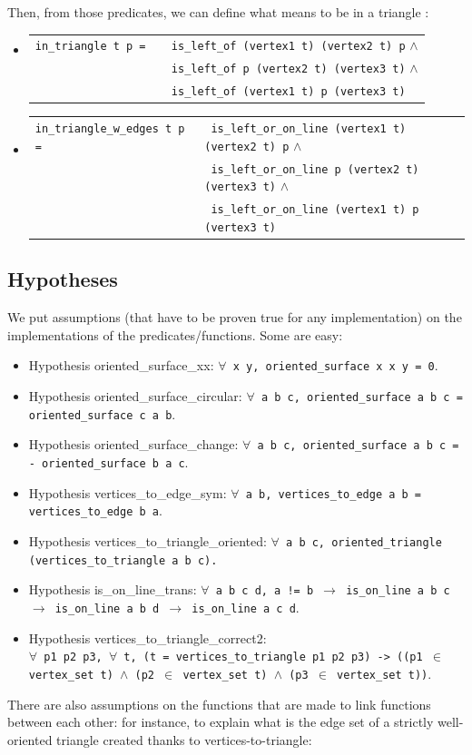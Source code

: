 \documentclass[a4paper,10pt]{article}
\def\hypothesis#1#2{{\color{purple}Hypothesis} {\color{blue}#1}: {\tt #2}}
\def\ttt#1#2{{\tt{\color{black}#1} #2}}
\begin{document}
  Then, from those predicates, we can define what means to be in a triangle :
  \begin{itemize}
    \item \begin{tabular}{ll}
       \ttt {in\_triangle}{t p = }& \ttt{}{is\_left\_of (vertex1 t) (vertex2 t) p} $\wedge$\\
        &\ttt{}{is\_left\_of p (vertex2 t) (vertex3 t)} $\wedge$\\
  & \ttt{}{is\_left\_of (vertex1 t) p (vertex3 t)}
      \end{tabular}
\item \begin{tabular}{ll}
       \ttt{in\_triangle\_w\_edges t p}{= }& \ttt{}{is\_left\_or\_on\_line (vertex1 t) (vertex2 t) p} $\wedge$\\
        & \ttt{}{is\_left\_or\_on\_line p  (vertex2 t) (vertex3 t)} $\wedge$\\
  & \ttt{}{is\_left\_or\_on\_line (vertex1 t) p (vertex3 t)}
      \end{tabular}
      \end{itemize}

  \subsection{Hypotheses}
\label{Hypothesis}
We put assumptions (that have to be proven true for any implementation) on the implementations of the predicates/functions. Some are easy:
\begin{itemize}
\item \hypothesis{oriented\_surface\_xx}{$\forall$ x y, {\tt oriented\_surface x x y} = 0}.
\item \hypothesis{oriented\_surface\_circular}{$\forall$ a b c, oriented\_surface a b c = oriented\_surface c a b}.
\item \hypothesis{oriented\_surface\_change}{$\forall$ a b c, oriented\_surface a b c = - oriented\_surface b a c}.
\item \hypothesis{vertices\_to\_edge\_sym}{$\forall$ a b, vertices\_to\_edge a b = vertices\_to\_edge b a}.
  \item 
\hypothesis{vertices\_to\_triangle\_oriented}{$\forall$ a b c, oriented\_triangle (vertices\_to\_triangle a b c).}
\item\hypothesis{is\_on\_line\_trans}{$\forall$ a b c d, a != b $\rightarrow$ is\_on\_line a b c $\rightarrow$ is\_on\_line a b d $\rightarrow$
  is\_on\_line a c d}.
\item \hypothesis{vertices\_to\_triangle\_correct2}{\\$\forall$ p1 p2 p3, $\forall$ t,
          (t = vertices\_to\_triangle p1 p2 p3) ->
  ((p1 $\in$ vertex\_set t) $\wedge$ (p2 $\in$ vertex\_set t) $\wedge$ (p3 $\in$ vertex\_set t))}.

\end{itemize}
There are also assumptions on the functions that are made to link functions between each other: for instance, to explain what is the edge set of a strictly well-oriented triangle created thanks to vertices-to-triangle:
\end{document}
